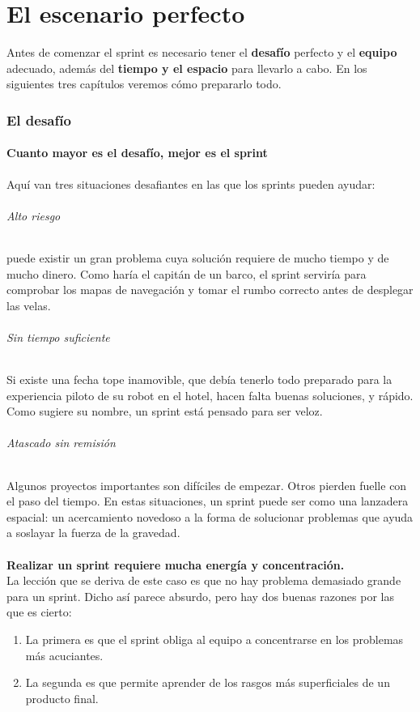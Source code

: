 \documentclass[10pt]{article}
\begin{document}
\part*{ \center El escenario perfecto}
Antes de comenzar el sprint es necesario tener el \textbf{desafío} perfecto y el \textbf{equipo} adecuado, además del \textbf{tiempo y el espacio} para llevarlo a cabo. En los siguientes tres capítulos veremos cómo prepararlo todo.
\begin{multicols}{2}
\section*{El desafío}
\subsection*{Cuanto mayor es el desafío, mejor es el sprint}
Aquí van tres situaciones desafiantes en las que los sprints pueden ayudar:
\paragraph*{Alto riesgo}
puede existir un gran problema cuya solución requiere de mucho tiempo y de mucho dinero. Como haría el capitán de un barco, el sprint serviría para comprobar los mapas de navegación y tomar el rumbo correcto antes de desplegar las velas.
\paragraph*{Sin tiempo suficiente}
Si existe una fecha tope inamovible,  que debía tenerlo todo preparado para la experiencia piloto de su robot en el hotel, hacen falta buenas soluciones, y rápido. Como sugiere su nombre, un sprint está pensado para ser veloz.
\paragraph*{Atascado sin remisión}
Algunos proyectos importantes son difíciles de empezar. Otros pierden fuelle con el paso del tiempo. En estas situaciones, un sprint puede ser como una lanzadera espacial: un acercamiento novedoso a la forma de solucionar problemas que ayuda a soslayar la fuerza de la gravedad.\\\\
\textbf{Realizar un sprint requiere mucha energía y concentración.} \\
La lección que se deriva de este caso es que no hay problema demasiado grande para un sprint. Dicho así parece absurdo, pero hay dos buenas razones por las que es cierto:
\begin{enumerate}[\bfseries 1.]
\item La primera es que el sprint obliga al equipo a concentrarse en los problemas más acuciantes.
\item La segunda es que permite aprender de los rasgos más superficiales de un producto final.
\end{enumerate}

\end{multicols}
\end{document}
